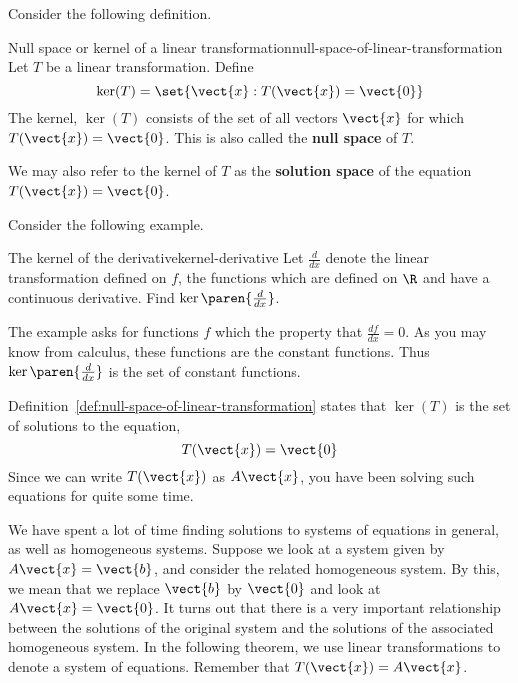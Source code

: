 Consider the following definition.

\begin{definition}{Null space or kernel of a linear transformation}{null-space-of-linear-transformation}
Let $T$ be a linear transformation. Define
\begin{equation*}
\ker (T) = \set{\vect{x}:T (\vect{x})= \vect{0} }
\end{equation*}
The kernel, $\ker (T) $ consists of the set of all vectors $\vect{x}$ for which
$T (\vect{x}) = \vect{0}$. This is also called the
\textbf{null space} of $T$.
\end{definition}

We may also refer to the kernel of $T$ as the
\textbf{solution space} of the equation $T (\vect{x}) = \vect{0}$.


Consider the following example.

\begin{example}{The kernel of the derivative}{kernel-derivative}
Let $\frac{d}{dx}$ denote the linear transformation defined on $f$, the functions
which are defined on $\R$ and have a continuous derivative. Find
$\ker \paren{\frac{d}{dx}}$.
\end{example}

\begin{solution} The example asks for functions $f$ which the property that $\frac{df}{dx}
=0. $ As you may know from calculus, these functions are the constant functions.
Thus $\ker \paren{\frac{d}{dx}}$ is the set of constant functions.
\end{solution}

Definition~\ref{def:null-space-of-linear-transformation} states that $\ker (T) $ is the set of
solutions to the equation,
\begin{equation*}
T(\vect{x}) = \vect{0}
\end{equation*}
Since we can write $T(\vect{x})$ as $A\vect{x}$, you have been solving such
equations for quite some time.

We have spent a lot of time finding solutions to systems of equations in general, as well as
homogeneous systems. Suppose we look at a system given by $A\vect{x}=\vect{b}$, and consider the
related homogeneous system. By this, we mean that we replace $\vect{b}$ by $\vect{0}$ and look at $A\vect{x}=\vect{0}$.
It turns out that there is a very important relationship between the solutions of the original
system and the solutions of the associated homogeneous system. In the following
theorem, we use linear transformations to denote a system of equations. Remember that
$T(\vect{x}) = A\vect{x}$.


